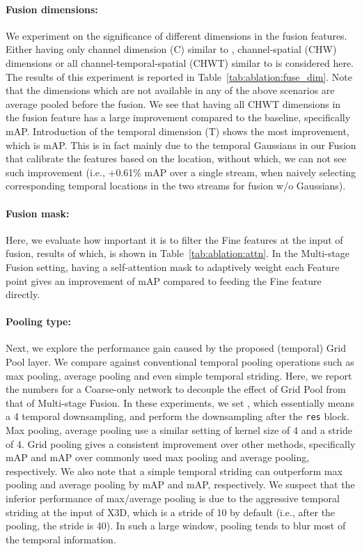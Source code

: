 \documentclass[final]{cvpr}
\newcommand{\tref}[1]{Table~\ref{#1}}
\begin{document}
\vspace{-3pt}
\paragraph{Fusion dimensions:} We experiment on the significance of different dimensions in the fusion features. Either having only channel dimension (C) similar to \cite{piergiovanni2018learning}, channel-spatial (CHW) dimensions or all channel-temporal-spatial (CHWT) similar to \cite{feichtenhofer2019slowfast} is considered here. The results of this experiment is reported in \tref{tab:ablation:fuse_dim}. Note that the dimensions which are not available in any of the above scenarios are average pooled before the fusion. We see that having all CHWT dimensions in the fusion feature has a large improvement compared to the baseline, specifically  mAP. Introduction of the temporal dimension (T) shows the most improvement, which is  mAP. This is in fact mainly due to the temporal Gaussians in our Fusion that calibrate the features based on the location, without which, we can not see such improvement (i.e., +0.61\% mAP over a single stream, when naively selecting corresponding temporal locations in the two streams for fusion w/o Gaussians).

\vspace{-3pt}
\paragraph{Fusion mask:} Here, we evaluate how important it is to filter the Fine features at the input of fusion, results of which, is shown in \tref{tab:ablation:attn}. In the Multi-stage Fusion setting, having a self-attention mask to adaptively weight each Feature point gives an improvement of  mAP compared to feeding the Fine feature directly.

\vspace{-3pt}
\paragraph{Pooling type:} Next, we explore the performance gain caused by the proposed (temporal) Grid Pool layer. We compare against conventional temporal pooling operations such as max pooling, average pooling and even simple temporal striding. Here, we report the numbers for a Coarse-only network to decouple the effect of Grid Pool from that of Multi-stage Fusion. In these experiments, we set , which essentially means a 4 temporal downsampling, and perform the downsampling after the \texttt{res} block. Max pooling, average pooling use a similar setting of kernel size of 4 and a stride of 4. Grid pooling gives a consistent improvement over other methods, specifically  mAP and  mAP over commonly used max pooling and average pooling, respectively. We also note that a simple temporal striding can outperform max pooling and average pooling by  mAP and  mAP, respectively. We suspect that the inferior performance of max/average pooling is due to the aggressive temporal striding at the input of X3D, which is a stride of 10 by default (i.e., after the pooling, the stride is 40). In such a large window, pooling tends to blur most of the temporal information.
\end{document}
